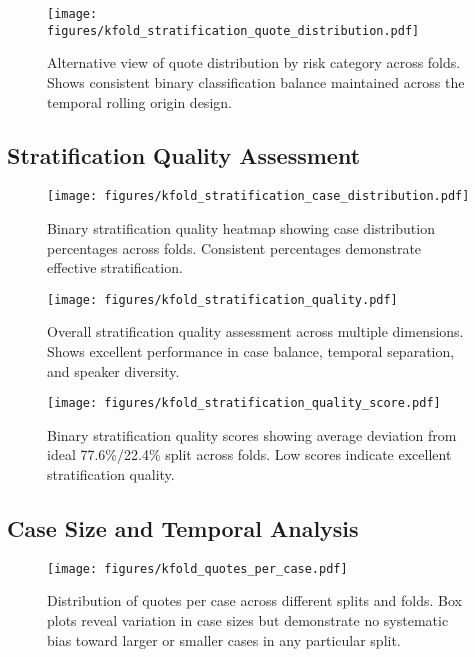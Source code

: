 \documentclass[11pt,a4paper]{article}
\begin{document}
\begin{figure}[H]
\centering
\texttt{[image: figures/kfold\_stratification\_quote\_distribution.pdf]}
\caption{Alternative view of quote distribution by risk category across folds. Shows consistent binary classification balance maintained across the temporal rolling origin design.}
\end{figure}

\subsection{Stratification Quality Assessment}

\begin{figure}[H]
\centering
\texttt{[image: figures/kfold\_stratification\_case\_distribution.pdf]}
\caption{Binary stratification quality heatmap showing case distribution percentages across folds. Consistent percentages demonstrate effective stratification.}
\end{figure}

\begin{figure}[H]
\centering
\texttt{[image: figures/kfold\_stratification\_quality.pdf]}
\caption{Overall stratification quality assessment across multiple dimensions. Shows excellent performance in case balance, temporal separation, and speaker diversity.}
\end{figure}

\begin{figure}[H]
\centering
\texttt{[image: figures/kfold\_stratification\_quality\_score.pdf]}
\caption{Binary stratification quality scores showing average deviation from ideal 77.6\%/22.4\% split across folds. Low scores indicate excellent stratification quality.}
\end{figure}

\subsection{Case Size and Temporal Analysis}

\begin{figure}[H]
\centering
\texttt{[image: figures/kfold\_quotes\_per\_case.pdf]}
\caption{Distribution of quotes per case across different splits and folds. Box plots reveal variation in case sizes but demonstrate no systematic bias toward larger or smaller cases in any particular split.}
\end{figure}
\end{document}
